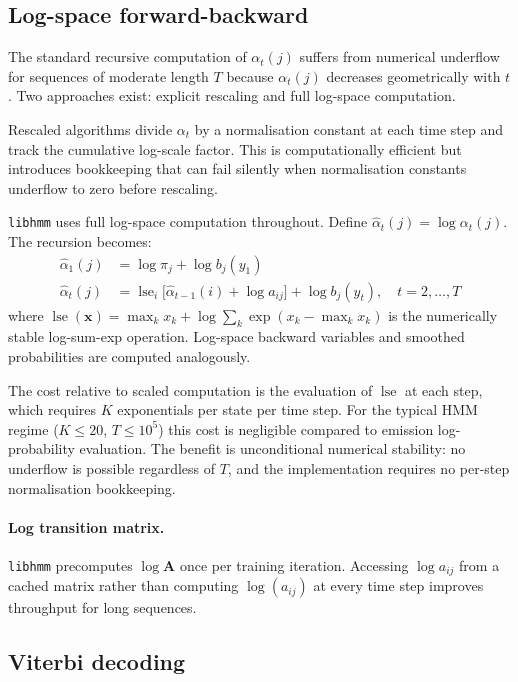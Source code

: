 \documentclass[11pt]{article}
\begin{document}
\subsection{Log-space forward-backward}
\label{sec:logspace}

The standard recursive computation of $\alpha_t(j)$ suffers from
numerical underflow for sequences of moderate length $T$ because
$\alpha_t(j)$ decreases geometrically with $t$.
Two approaches exist: explicit rescaling and full log-space computation.

Rescaled algorithms \citep{Rabiner1989} divide $\alpha_t$ by a normalisation
constant at each time step and track the cumulative log-scale factor.
This is computationally efficient but introduces bookkeeping that can fail
silently when normalisation constants underflow to zero before rescaling.

\texttt{libhmm} uses full log-space computation throughout.
Define $\hat{\alpha}_t(j) = \log \alpha_t(j)$.
The recursion becomes:
\begin{align}
  \hat{\alpha}_1(j) &= \log \pi_j + \log b_j(y_1) \label{eq:loginit} \\
  \hat{\alpha}_t(j) &= \operatorname{lse}_{i}\bigl[\hat{\alpha}_{t-1}(i)
    + \log a_{ij}\bigr] + \log b_j(y_t), \quad t = 2, \ldots, T
  \label{eq:logrec}
\end{align}
where $\operatorname{lse}(\mathbf{x}) = \max_k x_k + \log \sum_k \exp(x_k - \max_k x_k)$
is the numerically stable log-sum-exp operation.
Log-space backward variables and smoothed probabilities are computed
analogously.

The cost relative to scaled computation is the evaluation of
$\operatorname{lse}$ at each step, which requires $K$ exponentials per
state per time step.
For the typical HMM regime ($K \leq 20$, $T \leq 10^5$) this cost is
negligible compared to emission log-probability evaluation.
The benefit is unconditional numerical stability:
no underflow is possible regardless of $T$, and the implementation
requires no per-step normalisation bookkeeping.

\paragraph{Log transition matrix.}
\texttt{libhmm} precomputes $\log \mathbf{A}$ once per training iteration.
Accessing $\log a_{ij}$ from a cached matrix rather than computing
$\log(a_{ij})$ at every time step improves throughput for long sequences.

\subsection{Viterbi decoding}
\end{document}
